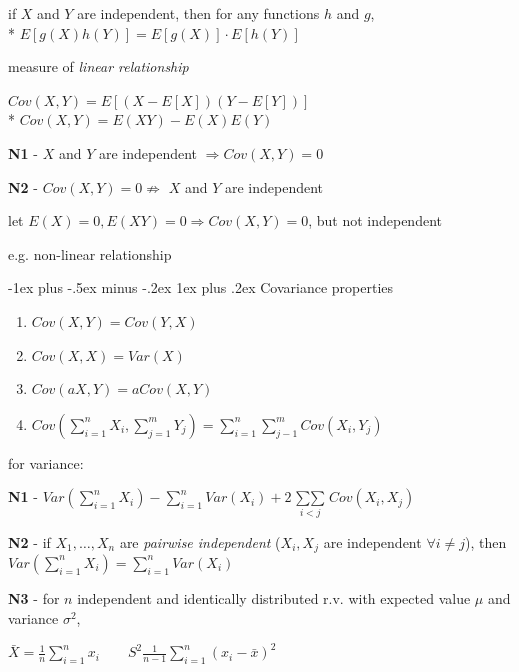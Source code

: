 \documentclass[10pt, landscape]{article}
\makeatletter
\renewcommand{\subsubsection}{\@startsection{subsubsection}{3}{0mm}%
  {-1ex plus -.5ex minus -.2ex}%
  {1ex plus .2ex}%
{\normalfont\small\bfseries}}%
\makeatother
\begin{document}
\begin{multicols*}{3}
    \begin{tightcenter}
      if $X$ and $Y$ are independent, then for any functions $h$ and $g$, 
      \\* $E[ g(X) h(Y) ] = E[g(X)] \cdot E[h(Y)] $
    \end{tightcenter}

     measure of \textit{linear relationship}

    \begin{tightcenter}
      $Cov (X, Y) = E[ (X-E[X]) (Y - E[Y]) ] $
      \\* $Cov(X, Y) = E(XY) - E(X)E(Y)$
    \end{tightcenter}

    \textbf{N1} - $X$ and $Y$ are independent $\Rightarrow Cov(X, Y) = 0$

    \textbf{N2} - $Cov(X, Y) = 0 \not\Rightarrow$ $X$ and $Y$ are independent

    \begin{niceproof}
      let $E(X) = 0, E(XY) = 0 \Rightarrow Cov(X, Y) = 0$, but not independent

      e.g. non-linear relationship
    \end{niceproof}

    \subsubsection{Covariance properties}

    \begin{enumerate}
      \item $Cov(X, Y) = Cov(Y, X)$ 
      \item $Cov(X, X) = Var(X)$ 
      \item $Cov(aX, Y) = aCov(X, Y)$
      \item $Cov (\sum\limits^n_{i=1} X_i, \sum\limits^m_{j=1} Y_j) = \sum\limits^n_{i=1} \sum\limits^m_{j-1} Cov(X_i, Y_j) $
    \end{enumerate}

    for variance:

    \textbf{N1} - $Var (\sum\limits^n_{i=1} X_i) - \sum\limits^n_{i=1} Var(X_i) + 2 \mathop{\sum\sum}\limits_{i<j} Cov(X_i, X_j) $

    \textbf{N2} - if $X_1, \dots, X_n$ are \textit{pairwise independent} ($X_i, X_j$ are independent $\forall i \neq j$), then $Var(\sum\limits^n_{i=1} X_i) = \sum\limits^n_{i=1} Var(X_i)$

    \textbf{N3} - for $n$ independent and identically distributed r.v. with expected value $\mu$ and variance  $\sigma^2$, 
    \begin{tightcenter}
      $\bar{X} = \frac{1}{n} \sum\limits^n_{i=1} x_i \quad\quad S^2 \frac{1}{n-1} \sum\limits^n_{i=1} (x_i - \bar{x})^2$ 


\end{tightcenter}
\end{multicols*}
\end{document}
